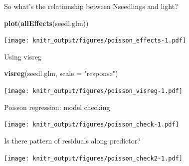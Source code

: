 \documentclass[10pt,ignorenonframetext,]{beamer}
\newenvironment{Shaded}{\begin{snugshade}}{\end{snugshade}}
\newcommand{\KeywordTok}[1]{\textcolor[rgb]{0.13,0.29,0.53}{\textbf{{#1}}}}
\newcommand{\DataTypeTok}[1]{\textcolor[rgb]{0.13,0.29,0.53}{{#1}}}
\newcommand{\StringTok}[1]{\textcolor[rgb]{0.31,0.60,0.02}{{#1}}}
\newcommand{\NormalTok}[1]{{#1}}
\begin{document}
\begin{frame}[fragile]{So what's the relationship between Nseedlings and
light?}

\begin{Shaded}
\begin{Highlighting}[]
\KeywordTok{plot}\NormalTok{(}\KeywordTok{allEffects}\NormalTok{(seedl.glm))}
\end{Highlighting}
\end{Shaded}

\texttt{[image: knitr\_output/figures/poisson\_effects-1.pdf]}

\end{frame}

\begin{frame}[fragile]{Using visreg}

\begin{Shaded}
\begin{Highlighting}[]
\KeywordTok{visreg}\NormalTok{(seedl.glm, }\DataTypeTok{scale =} \StringTok{"response"}\NormalTok{)}
\end{Highlighting}
\end{Shaded}

\texttt{[image: knitr\_output/figures/poisson\_visreg-1.pdf]}

\end{frame}

\begin{frame}{Poisson regression: model checking}

\texttt{[image: knitr\_output/figures/poisson\_check-1.pdf]}

\end{frame}

\begin{frame}[fragile]{Is there pattern of residuals along predictor?}

\begin{Shaded}
\end{Shaded}

\texttt{[image: knitr\_output/figures/poisson\_check2-1.pdf]}

\end{frame}
\end{document}
